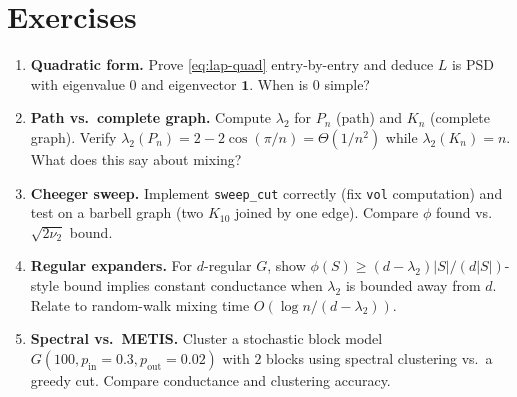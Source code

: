 \section{Exercises}
\label{sec:ch05-exercises}
\begin{enumerate}[label=E5.\arabic*, leftmargin=*, itemsep=0.7em]
    \item \textbf{Quadratic form.} Prove \eqref{eq:lap-quad} entry-by-entry and deduce $L$ is PSD with eigenvalue $0$ and eigenvector $\mathbf{1}$. When is $0$ simple?
    \item \textbf{Path vs.\ complete graph.} Compute $\lambda_2$ for $P_n$ (path) and $K_n$ (complete graph). Verify $\lambda_2(P_n)=2-2\cos(\pi/n)=\Theta(1/n^2)$ while $\lambda_2(K_n)=n$. What does this say about mixing?
    \item \textbf{Cheeger sweep.} Implement \texttt{sweep\_cut} correctly (fix \texttt{vol} computation) and test on a barbell graph (two $K_{10}$ joined by one edge). Compare $\phi$ found vs.\ $\sqrt{2\nu_2}$ bound.
    \item \textbf{Regular expanders.} For $d$-regular $G$, show $\phi(S)\ge(d-\lambda_2)|S|/(d|S|)$-style bound implies constant conductance when $\lambda_2$ is bounded away from $d$. Relate to random-walk mixing time $O(\log n/(d-\lambda_2))$.
    \item \textbf{Spectral vs.\ METIS.} Cluster a stochastic block model $G(100, p_{\text{in}}=0.3, p_{\text{out}}=0.02)$ with $2$ blocks using spectral clustering vs.\ a greedy cut. Compare conductance and clustering accuracy.
\end{enumerate}
